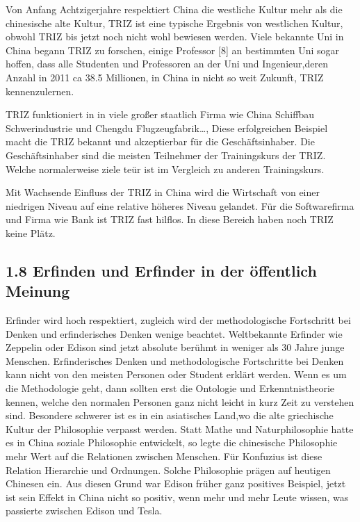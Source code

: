 \documentclass[11pt,a4paper]{article}
\begin{document}
Von Anfang Achtzigerjahre respektiert China die westliche Kultur mehr als die
chinesische alte Kultur, TRIZ ist eine typische Ergebnis von westlichen
Kultur, obwohl TRIZ bis jetzt noch nicht wohl bewiesen werden. Viele bekannte
Uni in China begann TRIZ zu forschen, einige Professor [8] an bestimmten Uni
sogar hoffen, dass alle Studenten und Professoren an der Uni und
Ingenieur,deren Anzahl in 2011 ca 38.5 Millionen, in China in nicht so weit
Zukunft, TRIZ kennenzulernen.  

TRIZ funktioniert in in viele großer staatlich Firma wie China Schiffbau
Schwerindustrie und Chengdu Flugzeugfabrik…, Diese erfolgreichen Beispiel
macht die TRIZ bekannt  und akzeptierbar  für die  Geschäftsinhaber.  Die
Geschäftsinhaber sind die meisten Teilnehmer der Trainingskurs der
TRIZ. Welche normalerweise ziele teür ist im Vergleich zu anderen
Trainingskurs. 

Mit Wachsende Einfluss der TRIZ in China wird die Wirtschaft von einer
niedrigen Niveau auf eine relative höheres Niveau gelandet. Für die
Softwarefirma und Firma wie Bank ist TRIZ fast hilflos. In diese Bereich haben
noch TRIZ keine Plätz. 

\subsection{1.8 Erfinden und Erfinder in der öffentlich Meinung}

Erfinder wird hoch respektiert, zugleich wird der methodologische Fortschritt
bei Denken und erfinderisches Denken wenige beachtet. Weltbekannte Erfinder
wie Zeppelin oder Edison sind jetzt absolute berühmt in weniger als 30 Jahre
junge Menschen. Erfinderisches Denken und methodologische Fortschritte bei
Denken kann nicht von den meisten Personen oder Student erklärt werden. Wenn
es um die Methodologie geht, dann sollten erst die Ontologie und
Erkenntnistheorie kennen, welche den normalen Personen ganz nicht leicht in
kurz Zeit zu verstehen sind. Besondere schwerer ist es in ein asiatisches
Land,wo die alte griechische Kultur der Philosophie verpasst werden. Statt
Mathe und Naturphilosophie hatte es in China soziale Philosophie entwickelt,
so legte die chinesische Philosophie mehr Wert auf die Relationen zwischen
Menschen. Für Konfuzius ist diese Relation Hierarchie und Ordnungen. Solche
Philosophie prägen auf heutigen Chinesen ein. Aus diesen Grund war Edison
früher ganz positives Beispiel, jetzt ist sein Effekt in China nicht so
positiv, wenn mehr und mehr Leute wissen, was passierte zwischen Edison und
Tesla.
\end{document}
